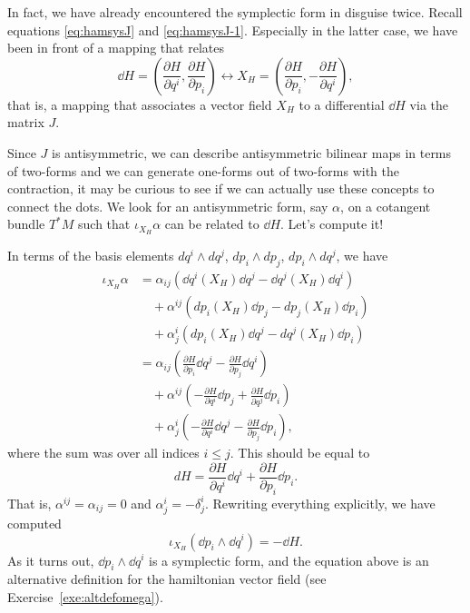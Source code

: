 \documentclass[english,fontsize=11pt,paper=b5]{scrbook}
\numberwithin{equation}{chapter}
\theoremstyle{definition}
\begin{document}
    In fact, we have already encountered the symplectic form in disguise twice.
    Recall equations \eqref{eq:hamsysJ} and \eqref{eq:hamsysJ-1}. Especially in the latter case, we have been in front of a mapping that relates
    \begin{equation}
      \dd H = \left(\frac{\partial H}{\partial q^i}, \frac{\partial H}{\partial p_i}\right) \leftrightarrow X_H = \left(\frac{\partial H}{\partial p_i}, - \frac{\partial H}{\partial q^i}\right),
    \end{equation}
    that is, a mapping that associates a vector field $X_H$ to a differential $\dd H$ via the matrix $J$.

    Since $J$ is antisymmetric, we can describe antisymmetric bilinear maps in terms of two-forms and we can generate one-forms out of two-forms with the contraction, it may be curious to see if we can actually use these concepts to connect the dots.
    We look for an antisymmetric form, say $\alpha$, on a cotangent bundle $T^*M$ such that $\iota_{X_H} \alpha$ can be related to $\dd H$. Let's compute it!

    In terms of the basis elements $dq^i\wedge dq^j$, $dp_i\wedge dp_j$, $dp_i\wedge dq^j$, we have
    \begin{align}
      \iota_{X_H} \alpha &= \alpha_{ij} (\dd q^i(X_H) \dd q^j - \dd q^j(X_H) \dd q^i) \\
                         &\quad + \alpha^{ij} (dp_i(X_H) \dd p_j - dp_j(X_H) \dd p_i) \\
                         &\quad + \alpha^i_j( dp_i(X_H) \dd q^j - dq^j(X_H) \dd p_i) \\
                         &= \alpha_{ij}\left(\frac{\partial H}{\partial p_i} \dd q^j - \frac{\partial H}{\partial p_j}\dd q^i\right) \\
                         &\quad + \alpha^{ij}\left(-\frac{\partial H}{\partial q^i}  \dd p_j + \frac{\partial H}{\partial q^j}  \dd p_i\right) \\
                         &\quad + \alpha^i_j\left(-\frac{\partial H}{\partial q^i} \dd q^j - \frac{\partial H}{\partial p_j} \dd p_i\right),
    \end{align}
    where the sum was over all indices $i\leq j$. This should be equal to
    \begin{equation}
      dH = \frac{\partial H}{\partial q^i} \dd q^i + \frac{\partial H}{\partial p_i} \dd p_i.
    \end{equation}
    That is, $\alpha^{ij}=\alpha_{ij} = 0$ and $\alpha^i_j = -\delta^i_j$.
    Rewriting everything explicitly, we have computed
    \begin{equation}
      \iota_{X_H}(\dd p_i\wedge \dd q^i) = - \dd H.
    \end{equation}
    As it turns out, $\dd p_i \wedge \dd q^i$ is a symplectic form, and the equation above is an alternative definition for the hamiltonian vector field (see Exercise~\ref{exe:altdefomega}).
\end{document}
